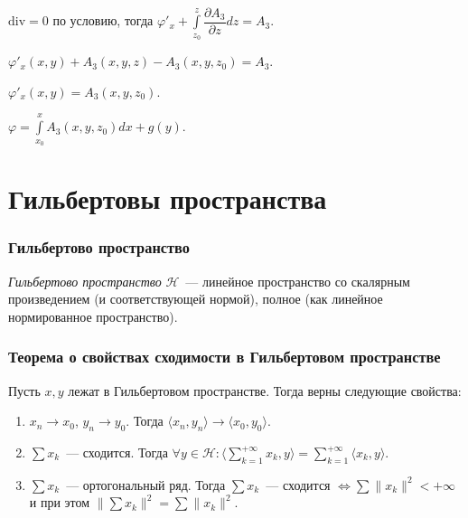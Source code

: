 \documentclass{article}
\begin{document}
                    $\mathrm{div} = 0$ по условию, тогда $\varphi'_x + \int\limits^z_{z_0} \dfrac{\partial A_3}{\partial z} dz = A_3$.
                    
                    $\varphi'_x(x, y) + A_3(x, y, z) - A_3(x, y, z_0) = A_3$.
                
                    $\varphi'_x(x, y) = A_3(x, y, z_0)$.
                
                    $\varphi = \int\limits^x_{x_0} A_3(x, y, z_0) dx + g(y)$.
                
\newpage
    
\part{Гильбертовы пространства}

\newpage
    
    \section{Гильбертово пространство}
    
        \textit{Гильбертово пространство} $\mathcal{H}$~--- линейное пространство со скалярным произведением (и соответствующей нормой), полное (как линейное нормированное пространство).
        
    \newpage
    
    \section{Теорема о свойствах сходимости в Гильбертовом пространстве}
    
        Пусть $x, y$ лежат в Гильбертовом пространстве. Тогда верны следующие свойства:
        
        \begin{enumerate}
        
            \item $x_n \rightarrow x_0$, $y_n \rightarrow y_0$. Тогда $\langle x_n, y_n \rangle \rightarrow \langle x_0, y_0 \rangle$.
            
            \item $\sum x_k$~--- сходится. Тогда $\forall y \in \mathcal{H} : \langle \sum\limits_{k = 1}^{+\infty} x_k, y \rangle = \sum\limits_{k = 1}^{+\infty} \langle x_k, y \rangle$.
            
            \item $\sum x_k$~--- ортогональный ряд. Тогда $\sum x_k$~--- сходится $\Longleftrightarrow \sum \| x_k \|^2 < +\infty$ и при этом $\| \sum x_k \|^2 = \sum \| x_k \|^2$.
            
        \end{enumerate}
        
\end{document}
